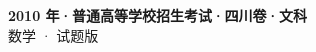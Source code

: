 \documentclass[zihao=-4, a4paper]{ctexart}
\begin{document}
\begin{center}
  {\Large\bfseries 2010 年·普通高等学校招生考试·四川卷·文科}\\[4pt]
  {\large 数学 · 试题版}
\end{center}
\medskip
{}

\end{document}
